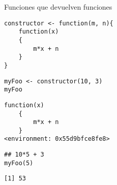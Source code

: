 \documentclass[xcolor={usenames,svgnames,dvipsnames}]{beamer}
\begin{document}
\begin{frame}[label={sec:org17ff12f},fragile]{Funciones que devuelven funciones}
 \lstset{language=r,label= ,caption= ,captionpos=b,numbers=none}
\begin{lstlisting}
constructor <- function(m, n){
    function(x)
    {
        m*x + n
    }
}
\end{lstlisting}

\lstset{language=r,label= ,caption= ,captionpos=b,numbers=none}
\begin{lstlisting}
myFoo <- constructor(10, 3)
myFoo
\end{lstlisting}

\begin{verbatim}
function(x)
    {
        m*x + n
    }
<environment: 0x55d9bfce8fe8>
\end{verbatim}


\lstset{language=r,label= ,caption= ,captionpos=b,numbers=none}
\begin{lstlisting}
## 10*5 + 3
myFoo(5)
\end{lstlisting}

\begin{verbatim}
[1] 53
\end{verbatim}
\end{frame}
\end{document}
